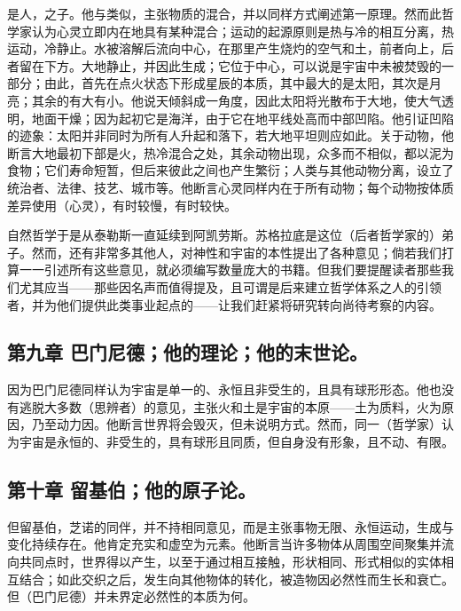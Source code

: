 是人，之子。他与类似，主张物质的混合，并以同样方式阐述第一原理。然而此哲学家认为心灵立即内在地具有某种混合；运动的起源原则是热与冷的相互分离，热运动，冷静止。水被溶解后流向中心，在那里产生烧灼的空气和土，前者向上，后者留在下方。大地静止，并因此生成；它位于中心，可以说是宇宙中未被焚毁的一部分；由此，首先在点火状态下形成星辰的本质，其中最大的是太阳，其次是月亮；其余的有大有小。他说天倾斜成一角度，因此太阳将光散布于大地，使大气透明，地面干燥；因为起初它是海洋，由于它在地平线处高而中部凹陷。他引证凹陷的迹象：太阳并非同时为所有人升起和落下，若大地平坦则应如此。关于动物，他断言大地最初下部是火，热冷混合之处，其余动物出现，众多而不相似，都以泥为食物；它们寿命短暂，但后来彼此之间也产生繁衍；人类与其他动物分离，设立了统治者、法律、技艺、城市等。他断言心灵同样内在于所有动物；每个动物按体质差异使用（心灵），有时较慢，有时较快。\par

自然哲学于是从泰勒斯一直延续到阿凯劳斯。苏格拉底是这位（后者哲学家的）弟子。然而，还有非常多其他人，对神性和宇宙的本性提出了各种意见；倘若我们打算一一引述所有这些意见，就必须编写数量庞大的书籍。但我们要提醒读者那些我们尤其应当——那些因名声而值得提及，且可谓是后来建立哲学体系之人的引领者，并为他们提供此类事业起点的——让我们赶紧将研究转向尚待考察的内容。\par


\subsection{第九章 巴门尼德；他的理论；他的末世论。}

因为巴门尼德同样认为宇宙是单一的、永恒且非受生的，且具有球形形态。他也没有逃脱大多数（思辨者）的意见，主张火和土是宇宙的本原——土为质料，火为原因，乃至动力因。他断言世界将会毁灭，但未说明方式。然而，同一（哲学家）认为宇宙是永恒的、非受生的，具有球形且同质，但自身没有形象，且不动、有限。\par


\subsection{第十章 留基伯；他的原子论。}

但留基伯，芝诺的同伴，并不持相同意见，而是主张事物无限、永恒运动，生成与变化持续存在。他肯定充实和虚空为元素。他断言当许多物体从周围空间聚集并流向共同点时，世界得以产生，以至于通过相互接触，形状相同、形式相似的实体相互结合；如此交织之后，发生向其他物体的转化，被造物因必然性而生长和衰亡。但（巴门尼德）并未界定必然性的本质为何。\par

